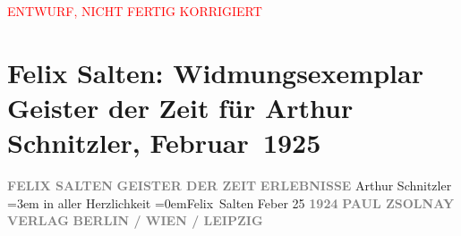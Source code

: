 
\begin{center}
            \textcolor{red}{ENTWURF, NICHT FERTIG KORRIGIERT}
                      \end{center}
            
         \renewcommand{\erwaehnteInstitutionen}{Institutionen: Paul Zsolnay Verlag}
         \renewcommand{\erwaehnteOrte}{Orte: Berlin, Leipzig, Wien}
         \renewcommand{\erwaehnteWerke}{Werke: Geister der Zeit. Erlebnisse}
               \section[Felix Salten: Widmungsexemplar Geister der Zeit für Arthur Schnitzler, Februar 1925]{ Felix Salten: Widmungsexemplar Geister der Zeit für Arthur Schnitzler,
               Februar 1925}\nopagebreak{}\rehead{ }\begin{ledgroupsized}[t]{13cm}\normalsize\beginnumbering \toendnotes[C]{\smallbreak\pagebreak[2]} 
\pstart
           \noindent{}\centering{}{\pb}\textcolor{gray}{\textbf{FELIX SALTEN}}\pend
           \pstart
           \noindent{}\centering{}\textcolor{gray}{\textbf{GEISTER DER ZEIT}}\pend
           \pstart
           \noindent{}\centering{}\textcolor{gray}{\textbf{ERLEBNISSE}}\pend
           {\bigskip}\pstart
           \noindent{}Arthur Schnitzler\pend
           \leftskip=3em{}\pstart
           \noindent{}in aller Herzlichkeit\pend
           \leftskip=0em{}\pstart \spacefill\mbox{Felix Salten}\pend{}\pstart
           Feber 25\pend
           {\bigskip}\pstart
           \noindent{}\centering{}\textcolor{gray}{\textbf{1924}}\pend
           \pstart
           \noindent{}\centering{}\textcolor{gray}{\textbf{PAUL ZSOLNAY VERLAG}}\pend
           \pstart
           \noindent{}\centering{}\textcolor{gray}{\textbf{BERLIN / WIEN / LEIPZIG}}\pend
           
         
         \endnumbering{}\end{ledgroupsized}\begin{anhang}\end{anhang}\newcommand{\dateiname}{L03042}\newcommand{\titel}{Felix Salten: Widmungsexemplar Geister der Zeit für Arthur Schnitzler, Februar 1925}\newcommand{\editorInnen}{Martin Anton Müller und Laura Untner}
      